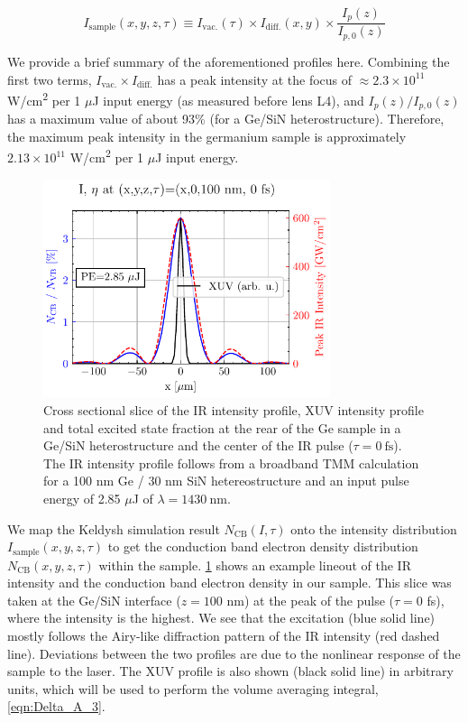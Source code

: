 \begin{equation}
I_{\textrm{sample}}(x, y, z, \tau) \equiv I_{\textrm{vac.}}(\tau) \times I_{\textrm{diff.}}(x, y) \times \frac{I_p(z)}{I_{p,0}(z)}
\label{eqn:sample_intensity_XYZtau}
\end{equation}

We provide a brief summary of the aforementioned profiles here. Combining the first two terms, $I_{\textrm{vac.}} \times I_{\textrm{diff.}}$ has a peak intensity at the focus of $\approx 2.3 \times 10^{11}$ W/cm\textsuperscript{2} per 1 $\mu$J input energy (as measured before lens L4), and $I_p(z) / I_{p,0}(z)$ has a maximum value of about 93\% (for a Ge/SiN heterostructure). Therefore, the maximum peak intensity in the germanium sample is approximately $2.13 \times 10^{11}$ W/cm\textsuperscript{2} per 1 $\mu$J input energy. 

\begin{figure}
	\centering
	\includegraphics[width=0.75\textwidth]{figures/chap4/excitation_at_focus.pdf}
	\caption{Cross sectional slice of the IR intensity profile, XUV intensity profile and total excited state fraction at the rear of the Ge sample in a Ge/SiN heterostructure and the center of the IR pulse ($\tau = 0 \ \textrm{fs}$). The IR intensity profile follows from a broadband TMM calculation for a 100 nm Ge / 30 nm SiN hetereostructure and an input pulse energy of 2.85 $\mu$J of $\lambda = 1430 \ \textrm{nm}$.}
	\label{fig:excitation_at_focus}
\end{figure}

We map the Keldysh simulation result $N_{\textrm{CB}}(I, \tau)$ onto the intensity distribution $I_{\textrm{sample}}(x, y, z, \tau)$ to get the conduction band electron density distribution $N_{\textrm{CB}}(x, y, z, \tau)$ within the sample. \cref{fig:excitation_at_focus} shows an example lineout of the IR intensity and the conduction band electron density in our sample. This slice was taken at the Ge/SiN interface ($z=100$ nm) at the peak of the pulse ($\tau=0$ fs), where the intensity is the highest. We see that the excitation (blue solid line) mostly follows the Airy-like diffraction pattern of the IR intensity (red dashed line). Deviations between the two profiles are due to the nonlinear response of the sample to the laser. The XUV profile is also shown (black solid line) in arbitrary units, which will be used to perform the volume averaging integral, \cref{eqn:Delta_A_3}.

